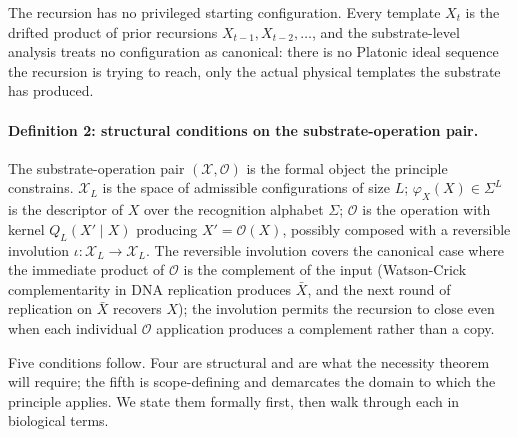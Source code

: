 \documentclass[aps,prx,reprint,amsmath,amssymb,floatfix,superscriptaddress,nofootinbib]{revtex4-2}
\theoremstyle{plain-thm}
\theoremstyle{definition-thm}
\newcommand{\descX}{\varphi_X}
\newcommand{\Xset}{\mathcal{X}}
\newcommand{\Op}{\mathcal{O}}
\begin{document}
The recursion has no privileged starting configuration. Every template $X_t$ is the drifted product of prior recursions $X_{t-1}, X_{t-2}, \ldots$, and the substrate-level analysis treats no configuration as canonical: there is no Platonic ideal sequence the recursion is trying to reach, only the actual physical templates the substrate has produced.

\paragraph{Definition 2: structural conditions on the substrate-operation pair.}

The substrate-operation pair $(\Xset, \Op)$ is the formal object the principle constrains. $\Xset_L$ is the space of admissible configurations of size $L$; $\descX(X) \in \Sigma^L$ is the descriptor of $X$ over the recognition alphabet $\Sigma$; $\Op$ is the operation with kernel $Q_L(X' \mid X)$ producing $X' = \Op(X)$, possibly composed with a reversible involution $\iota: \Xset_L \to \Xset_L$. The reversible involution covers the canonical case where the immediate product of $\Op$ is the complement of the input (Watson-Crick complementarity in DNA replication produces $\bar{X}$, and the next round of replication on $\bar{X}$ recovers $X$); the involution permits the recursion to close even when each individual $\Op$ application produces a complement rather than a copy.

Five conditions follow. Four are structural and are what the necessity theorem will require; the fifth is scope-defining and demarcates the domain to which the principle applies. We state them formally first, then walk through each in biological terms.
\end{document}
